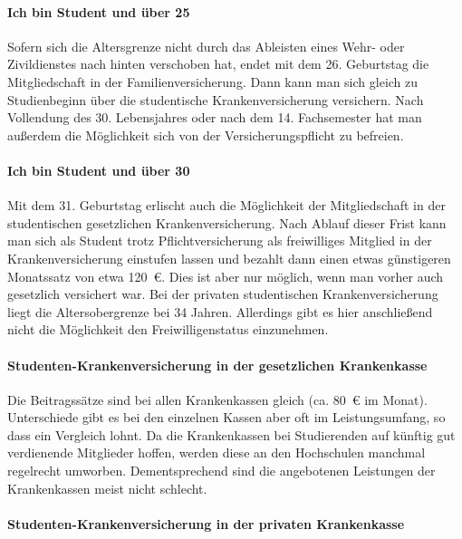 \documentclass[twoside,12pt,parskip=half-]{scrartcl}
\begin{document}
\paragraph{Ich bin Student und über 25}

Sofern sich die Altersgrenze nicht durch das Ableisten eines Wehr-
oder Zivildienstes nach hinten verschoben hat, endet mit dem
26. Geburtstag die Mitgliedschaft in der Familienversicherung. Dann
kann man sich gleich zu Studienbeginn über die studentische
Krankenversicherung versichern. Nach Vollendung des 30. Lebensjahres
oder nach dem 14. Fachsemester hat man außerdem die Möglichkeit sich
von der Versicherungspflicht zu befreien.

\paragraph{Ich bin Student und über 30}

Mit dem 31. Geburtstag erlischt auch die Möglichkeit der
Mitgliedschaft in der studentischen gesetzlichen
Krankenversicherung. Nach Ablauf dieser Frist kann man sich als
Student trotz Pflichtversicherung als freiwilliges Mitglied in der
Krankenversicherung einstufen lassen und bezahlt dann einen etwas
günstigeren Monatssatz von etwa 120~€. Dies ist aber nur möglich, wenn
man vorher auch gesetzlich versichert war. Bei der privaten
studentischen Krankenversicherung liegt die Altersobergrenze bei 34
Jahren. Allerdings gibt es hier anschließend nicht die Möglichkeit den
Freiwilligenstatus einzunehmen.

\paragraph{Studenten-Krankenversicherung in der gesetzlichen Krankenkasse}

Die Beitragssätze sind bei allen Krankenkassen gleich (ca. 80~€ im
Monat). Unterschiede gibt es bei den einzelnen Kassen aber oft im
Leistungsumfang, so dass ein Vergleich lohnt. Da die Krankenkassen bei
Studierenden auf künftig gut verdienende Mitglieder hoffen, werden
diese an den Hochschulen manchmal regelrecht umworben. Dementsprechend
sind die angebotenen Leistungen der Krankenkassen meist nicht
schlecht.

\paragraph{Studenten-Krankenversicherung in der privaten Krankenkasse}
\end{document}
